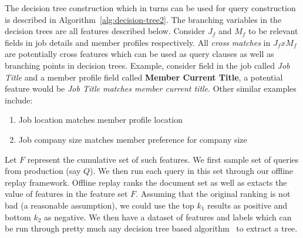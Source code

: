 The decision tree construction which in turns can be used for query
construction is described in Algorithm~\ref{alg:decision-tree2}. The branching
variables in the decision trees are all features described below. Consider $J_f$ 
and $M_f$ to be relevant fields in job details
and member profiles respectively. All {\it cross matches} in $J_f x M_f$ are
potentially cross features which can be used as query clauses as well as
branching points in decision trees. Example, consider field in the job called
{\it Job Title} and a member profile field called {\bf Member Current Title}, a
potential feature would be {\it Job Title matches member current title}. Other
similar examples include:
\begin{enumerate}
    \item Job location matches member profile location
    \item Job company size matches member preference for company size
\end{enumerate}
Let $F$ represent the cumulative set of such features. We first sample set of
queries from production (say $Q$). We then run each query in this set through
our offline replay framework. Offline replay ranks the document set as well as
extacts the value of features in the feature set $F$. Assuming that the
original ranking is not bad (a reasonable assumption), we could use the top
$k_1$ results as positive and bottom $k_2$ as negative. We then have a dataset
of features and labels which can be run through pretty much any decision tree
based algorithm~\cite{quinlan1986induction} to extract a tree. 
%   

